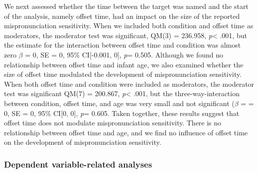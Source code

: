\documentclass[man]{apa6}
\theoremstyle{definition}
\theoremstyle{definition}
\theoremstyle{definition}
\theoremstyle{remark}
\begin{document}
We next assessed whether the time between the target was named and the
start of the analysis, namely offset time, had an impact on the size of
the reported mispronunciation sensitivity. When we included both
condition and offset time as moderators, the moderator test was
significant, QM(3) = 236.958, \emph{p}\textless{} .001, but the estimate
for the interaction between offset time and condition was almost zero
\(\beta\) = 0, SE = 0, 95\% CI{[}-0.001, 0{]}, \emph{p}= 0.505. Although
we found no relationship between offset time and infant age, we also
examined whether the size of offset time modulated the development of
mispronunciation sensitivity. When both offset time and condition were
included as moderators, the moderator test was significant QM(7) =
200.867, \emph{p}\textless{} .001, but the three-way-interaction between
condition, offset time, and age was very small and not significant
(\(\beta\) = = 0, SE = 0, 95\% CI{[}0, 0{]}, \emph{p}= 0.605. Taken
together, these results suggest that offset time does not modulate
mispronunciation sensitivity. There is no relationship between offset
time and age, and we find no influence of offset time on the development
of mispronunciation sensitivity.

\subsubsection{Dependent variable-related
analyses}\label{dependent-variable-related-analyses}
\end{document}
